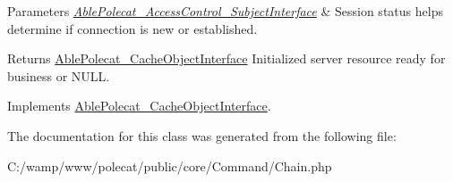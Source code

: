 \begin{DoxyParams}{Parameters}
{\em \hyperlink{interface_able_polecat___access_control___subject_interface}{Able\+Polecat\+\_\+\+Access\+Control\+\_\+\+Subject\+Interface}} & Session status helps determine if connection is new or established.\\
\hline
\end{DoxyParams}
\begin{DoxyReturn}{Returns}
\hyperlink{interface_able_polecat___cache_object_interface}{Able\+Polecat\+\_\+\+Cache\+Object\+Interface} Initialized server resource ready for business or N\+U\+L\+L. 
\end{DoxyReturn}


Implements \hyperlink{interface_able_polecat___cache_object_interface_a3f2135f6ad45f51d075657f6d20db2cd}{Able\+Polecat\+\_\+\+Cache\+Object\+Interface}.



The documentation for this class was generated from the following file\+:\begin{DoxyCompactItemize}
\item 
C\+:/wamp/www/polecat/public/core/\+Command/Chain.\+php\end{DoxyCompactItemize}

